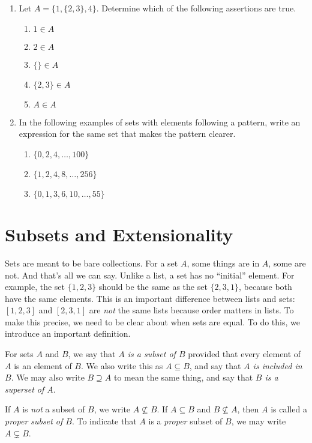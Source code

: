 \begin{exercises}
	\begin{enumerate}
  \item Let $A = \{1,\{2,3\},4\}$. Determine which of the following assertions are true.
    \begin{enumerate}
    \item $1\in A$
    \item $2\in A$
    \item $\{\}\in A$
    \item $\{2,3\}\in A$
    \item $A\in A$
    \end{enumerate}
  \item In the following examples of sets with elements following a pattern, write an expression for the same set
  that makes the pattern clearer.
  \begin{enumerate}
  \item $\{0,2,4,\ldots, 100\}$
  \item $\{1,2,4,8,\ldots, 256\}$
  \item $\{0,1,3, 6, 10,\ldots, 55\}$
  \end{enumerate}
  \end{enumerate}
\end{exercises}

\section{Subsets and Extensionality}

Sets are meant to be bare collections. For a set $A$, some things are in $A$, some are not. And that's all we can say.
Unlike a list, a set has no ``initial'' element.
For example, the set $\{1,2,3\}$ should be the same as the set $\{2,3,1\}$, because both have the same elements. This is an important difference between
lists and sets: $[1,2,3]$ and $[2,3,1]$ are \emph{not} the same lists because order matters in lists. 
To make this precise, we need to be clear about when sets are equal. To do this, we introduce an important definition.

\begin{defn}
  For sets $A$ and $B$, we say that \emph{$A$ is a subset of $B$} provided that every element of $A$ is an element of $B$. We also
  write this as $A\subseteq B$, and say that \emph{$A$ is included in $B$}.  We may also write $B\supseteq A$ 
  to mean the same thing, and say that \emph{$B$ is a superset of $A$}.

  If $A$ is \emph{not} a subset of $B$, we write $A\not\subseteq B$. If $A\subseteq B$ and $B\not\subseteq A$, then $A$ is called a
  \emph{proper subset of $B$}. To indicate that $A$ is a \emph{proper} subset of $B$, we may write $A\subsetneq B$.
\end{defn}

